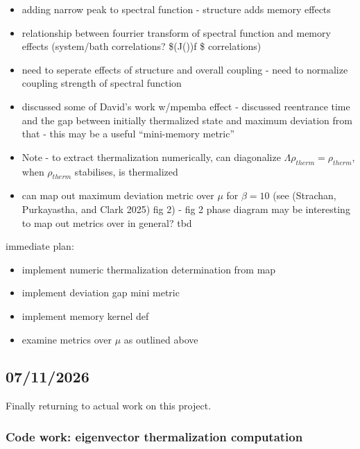 \documentclass[
  letterpaper,
  DIV=11,
  numbers=noendperiod]{scrartcl}
\providecommand{\tightlist}{%
  \setlength{\itemsep}{0pt}\setlength{\parskip}{0pt}}
\begin{document}
\begin{itemize}
\tightlist
\item
  adding narrow peak to spectral function - structure adds memory
  effects
\item
  relationship between fourrier transform of spectral function and
  memory effects (system/bath correlations?
  \$(J(\omega))\cdot f \approx \$ correlations)
\item
  need to seperate effects of structure and overall coupling - need to
  normalize coupling strength of spectral function
\item
  discussed some of David's work w/mpemba effect - discussed reentrance
  time and the gap between initially thermalized state and maximum
  deviation from that - this may be a useful ``mini-memory metric''
\item
  Note - to extract thermalization numerically, can diagonalize
  \(\Lambda \rho_{therm} = \rho_{therm}\), when \(\rho_{therm}\)
  stabilises, is thermalized
\item
  can map out maximum deviation metric over \(\mu\) for \(\beta=10\)
  (see (Strachan, Purkayastha, and Clark 2025) fig 2) - fig 2 phase
  diagram may be interesting to map out metrics over in general? tbd
\end{itemize}

immediate plan:

\begin{itemize}
\tightlist
\item
  implement numeric thermalization determination from map
\item
  implement deviation gap mini metric
\item
  implement memory kernel def
\item
  examine metrics over \(\mu\) as outlined above
\end{itemize}

\subsection{07/11/2026}\label{section-2}

Finally returning to actual work on this project.

\subsubsection{Code work: eigenvector thermalization
computation}\label{code-work-eigenvector-thermalization-computation}
\end{document}
